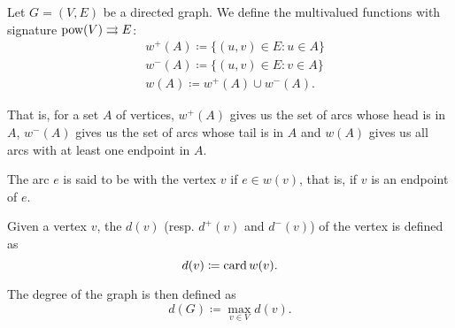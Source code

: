 \begin{definition}\label{def:graph_incidence}
  Let \( G = (V, E) \) be a directed graph. We define the multivalued functions with signature \( \operatorname{pow}(V) \rightrightarrows E \):
  \begin{align*}
    &w^+(A) \coloneqq \{ (u, v) \in E \colon u \in A \} \\
    &w^-(A) \coloneqq \{ (u, v) \in E \colon v \in A \} \\
    &w(A) \coloneqq w^+(A) \cup w^-(A).
  \end{align*}

  That is, for a set \( A \) of vertices, \( w^+(A) \) gives us the set of arcs whose head is in \( A \), \( w^-(A) \) gives us the set of arcs whose tail is in \( A \) and \( w(A) \) gives us all arcs with at least one endpoint in \( A \).

  \begin{defenum}
     The arc \( e \) is said to be  with the vertex \( v \) if \( e \in w(v) \), that is, if \( v \) is an endpoint of \( e \).

    \cite[chapter 1, section 1.4]{Gondran1984} Given a vertex \( v \), the  \( d(v) \) (resp.  \( d^+(v) \) and  \( d^-(v) \)) of the vertex is defined as
    \begin{equation*}
      d(v) \coloneqq \operatorname{card} w(v).
    \end{equation*}

    The degree of the graph is then defined as
    \begin{equation*}
      d(G) \coloneqq \max_{v \in V} d(v).
    \end{equation*}
  \end{defenum}
\end{definition}

